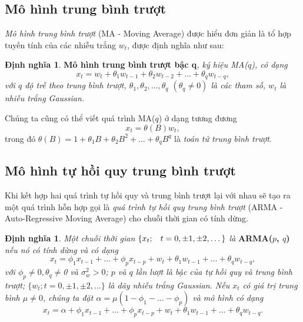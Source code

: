\documentclass[12pt, a4paper,oneside]{book}
\theoremstyle{definition}
\newtheorem{dn}[theo]{Định nghĩa}
\begin{document}
\subsection{Mô hình trung bình trượt}
\textit{Mô hình trung bình trượt} (MA - Moving Average) được hiểu đơn giản là tổ hợp tuyến tính của các nhiễu trắng $w_t$, được định nghĩa như sau:

\begin{dn}\cite{8} \textbf{Mô hình trung bình trượt bậc q}\textit{, ký hiệu MA($q$), có dạng
		\begin{equation}
		x_{t}= w_{t}+\theta_{1}w_{t-1}+ \theta_{2}w_{t-2}+ \dots+\theta_{q}w_{t-q}, \label{ct1.100}
		\end{equation}
		với $q$ độ trễ theo trung bình trượt, $\theta_{1}, \theta_{2},\dots, \theta_{q}$  $(\theta_{q} \neq 0)$ là các tham số, $w_{t}$ là nhiễu trắng Gaussian.}
\end{dn}
Chúng ta cũng có thể viết quá trình MA($q$) ở dạng tương đương
\begin{equation}
x_{t}= \theta(B)w_{t}, \label{ct1.101}
\end{equation}
trong đó $ \theta(B)= 1+\theta_{1}B+\theta_{2}B^{2}+\dots+ \theta_{q}B^{q}$ là \textit{toán tử trung bình trượt}.

\subsection{Mô hình tự hồi quy trung bình trượt}
Khi kết hợp hai quá trình tự hồi quy và trung bình trượt lại với nhau sẽ tạo ra một quá trình hỗn hợp gọi là \textit{quá trình tự hồi quy trung bình trượt} (ARMA - Auto-Regressive Moving Average) cho chuỗi thời gian có tính dừng.
\begin{dn}\cite{8} 
	\textit{Một chuỗi thời gian $\{x_{t}; \hspace{0.3cm} t=0,\pm1,\pm2, \dots\}$ là} \textbf{ARMA($p$, $q$)} \textit{nếu nó có tính dừng và có dạng
		\begin{equation}
		x_{t}= \phi_{1}x_{t-1}+ \dots+\phi_{p}x_{t-p} + w_{t} + \theta_{1}w_{t-1}+ \dots+ \theta_{q}w_{t-q}, \label{ct1.104}
		\end{equation}
		với $\phi_{p} \neq 0, \theta_q \neq $0 và $\sigma_{w}^{2}> 0$; $p$ và $q$ lần lượt là bậc của tự hồi quy và trung bình trượt; $\{w_{t}; t = 0, \pm 1, \pm 2, \dots\}$ là dãy nhiễu trắng Gaussian. Nếu $x_{t}$ có giá trị trung bình $\mu \neq 0$, chúng ta đặt $\alpha = \mu(1 − \phi_{1} -\dots- \phi_{p})$ và mô hình có dạng
		\begin{equation}
		x_{t}= \alpha + \phi_{1}x_{t-1}+\dots+\phi_{p}x_{t-p}+w_{t}+\theta_{1}w_{t-1}+\dots+\theta_{q}w_{t-q}. \label{ct1.105}	
		\end{equation}}
\end{dn}
\end{document}
